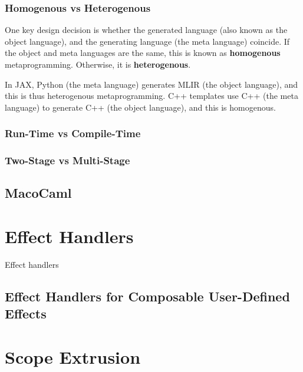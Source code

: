 \subsubsection{Homogenous vs Heterogenous}
One key design decision is whether the generated language (also known as the object language), and the generating language (the meta language) coincide. If the object and meta languages are the same, this is known as \textbf{homogenous} metaprogramming. Otherwise, it is \textbf{heterogenous}.

In JAX, Python (the meta language) generates MLIR (the object language), and this is thus heterogenous metaprogramming. C++ templates use C++ (the meta language) to generate C++ (the object language), and this is homogenous.


\subsubsection{Run-Time vs Compile-Time}

\subsubsection{Two-Stage vs Multi-Stage}

\subsection{MacoCaml}\label{subsection:metaprogramming-macocaml}

\section{Effect Handlers}\label{section:effects-technical}
Effect handlers 
\subsection{Effect Handlers for Composable User-Defined Effects}

\section{Scope Extrusion}\label{section:scope-extrusion-technical}